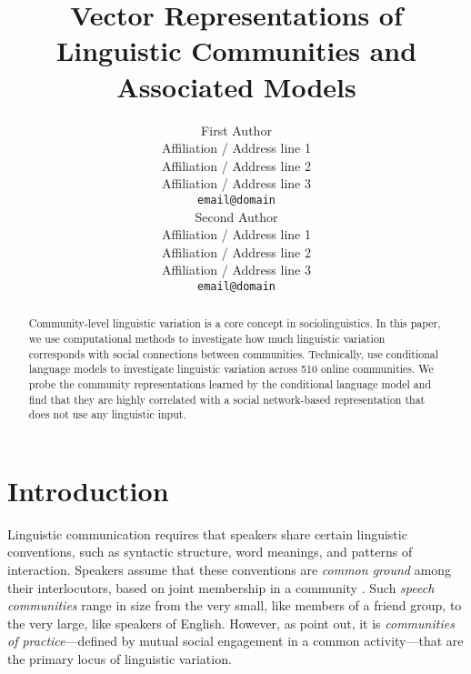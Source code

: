 \documentclass[11pt]{article}
\title{Vector Representations of Linguistic Communities and Associated Models}
\author{First Author \\
  Affiliation / Address line 1 \\
  Affiliation / Address line 2 \\
  Affiliation / Address line 3 \\
  \texttt{email@domain} \\\And
  Second Author \\
  Affiliation / Address line 1 \\
  Affiliation / Address line 2 \\
  Affiliation / Address line 3 \\
  \texttt{email@domain} \\}
\date{}
\begin{document}
\maketitle
\begin{abstract}
  Community-level linguistic variation is a core concept in sociolinguistics.
  In this paper, we use computational methods to investigate how much linguistic variation corresponds with social connections between communities.
  Technically, use conditional language models to investigate linguistic variation
  across 510 online communities.
  We probe the community representations learned by the conditional language model
  and find that they are highly correlated with a social network-based 
  representation that does not use any linguistic input.
\end{abstract}








\section{Introduction}

Linguistic communication requires that speakers share
certain linguistic conventions, such as syntactic
structure, word meanings, and patterns of interaction.
Speakers assume that these conventions are \emph{common ground} among
their interlocutors, based on joint membership in a community
\cite{Stalnaker2002, Clark1996}.  Such \emph{speech communities} \citep{Gumperz1972} 
range in size from the very small, like members of a friend group, 
to the very large, like speakers of English. However, as \citet{Eckert1992}
point out, it is \emph{communities of practice}---defined by mutual social engagement
in a common activity---that are the primary locus of linguistic variation.
\end{document}
